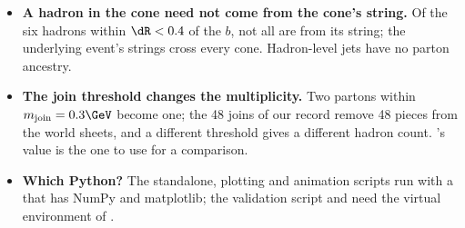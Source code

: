 \begin{pitfalls}
\begin{itemize}[nosep]
  \item \textbf{A hadron in the cone need not come from the cone's string.}
    Of the six hadrons within $\dR<0.4$ of the $b$, not all are from its
    string; the underlying event's strings cross every cone. Hadron-level
    jets have no parton ancestry.
  \item \textbf{The join threshold changes the multiplicity.} Two partons
    within $m_{\mathrm{join}}=0.3\GeV$ become one; the 48 joins of our
    record remove 48 pieces from the world sheets, and a different
    threshold gives a different hadron count. \PYTHIA's value is the one
    to use for a comparison.
  \item \textbf{Which Python?} The standalone, plotting and animation
    scripts run with a  that has NumPy and matplotlib; the
    validation script and  need the virtual
    environment of .
\end{itemize}
\end{pitfalls}

